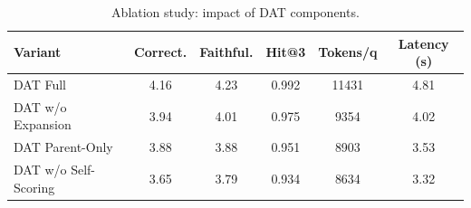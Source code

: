 \begin{table}[t]
\centering
\caption{Ablation study: impact of DAT components.}
\label{tab:ablation}
\begin{tabular}{lccccc}
\toprule
\textbf{Variant} & \textbf{Correct.} & \textbf{Faithful.} & \textbf{Hit@3} & \textbf{Tokens/q} & \textbf{Latency (s)} \\
\midrule
DAT Full & 4.16 & 4.23 & 0.992 & 11431 & 4.81 \\
DAT w/o Expansion & 3.94 & 4.01 & 0.975 & 9354 & 4.02 \\
DAT Parent-Only & 3.88 & 3.88 & 0.951 & 8903 & 3.53 \\
DAT w/o Self-Scoring & 3.65 & 3.79 & 0.934 & 8634 & 3.32 \\
\bottomrule
\end{tabular}
\end{table}
